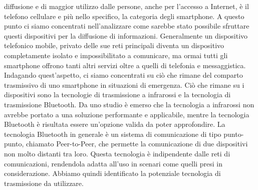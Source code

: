 diffusione e di maggior utilizzo dalle persone, anche per l'accesso a Internet, è il telefono cellulare e più nello specifico, la categoria degli smartphone. A questo punto ci siamo concentrati nell'analizzare come sarebbe stato possibile sfruttare questi dispositivi per la diffusione di informazioni. Generalmente un dispositivo telefonico mobile, privato delle sue reti principali diventa un dispositivo completamente isolato e impossibilitato a comunicare, ma ormai tutti gli smartphone offrono tanti altri servizi oltre a quelli di telefonia e messaggistica. Indagando quest'aspetto, ci siamo concentrati su ciò che rimane del comparto trasmissivo di uno smartphone in situazioni di emergenza. Ciò che rimane su i dispositivi sono la tecnologie di trasmissione a infrarossi e la tecnologia di trasmissione Bluetooth. Da uno studio è emerso che la tecnologia a infrarossi non avrebbe portato a una soluzione performante e applicabile, mentre la tecnologia Bluetooth è risultata essere un'opzione valida da poter approfondire. La tecnologia Bluetooth in generale è un sistema di comunicazione di tipo punto-punto, chiamato Peer-to-Peer, che permette la comunicazione di due dispositivi non molto distanti tra loro. Questa tecnologia è indipendente dalle reti di comunicazioni, rendendola adatta all'uso in scenari come quelli presi in considerazione. Abbiamo quindi identificato la potenziale tecnologia di trasmissione da utilizzare.

